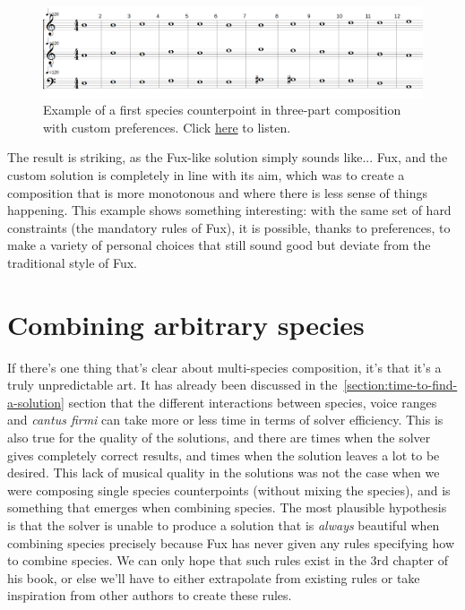 \begin{figure}[h!]
    \centering
    \includegraphics[width=1\textwidth]{Images/Musicality/musicality-1sp-custom-pref.png}
    \caption{Example of a first species counterpoint in three-part composition with custom preferences. Click \href{https://youtu.be/rXGOzidniA0}{here} to listen.}
    \label{fig:musicality-1sp-custom}
\end{figure}

The result is striking, as the Fux-like solution simply sounds like... Fux, and the custom solution is completely in line with its aim, which was to create a composition that is more monotonous and where there is less sense of things happening. This example shows something interesting: with the same set of hard constraints (the mandatory rules of Fux), it is possible, thanks to preferences, to make a variety of personal choices that still sound good but deviate from the traditional style of Fux. 

\section{Combining arbitrary species}
If there's one thing that's clear about multi-species composition, it's that it's a truly unpredictable art. It has already been discussed in the~\ref{section:time-to-find-a-solution} section that the different interactions between species, voice ranges and \textit{cantus firmi} can take more or less time in terms of solver efficiency. This is also true for the quality of the solutions, and there are times when the solver gives completely correct results, and times when the solution leaves a lot to be desired. This lack of musical quality in the solutions was not the case when we were composing single species counterpoints (without mixing the species), and is something that emerges when combining species. The most plausible hypothesis is that the solver is unable to produce a solution that is \textit{always} beautiful when combining species precisely because Fux has never given any rules specifying how to combine species. We can only hope that such rules exist in the 3rd chapter of his book, or else we'll have to either extrapolate from existing rules or take inspiration from other authors to create these rules.


